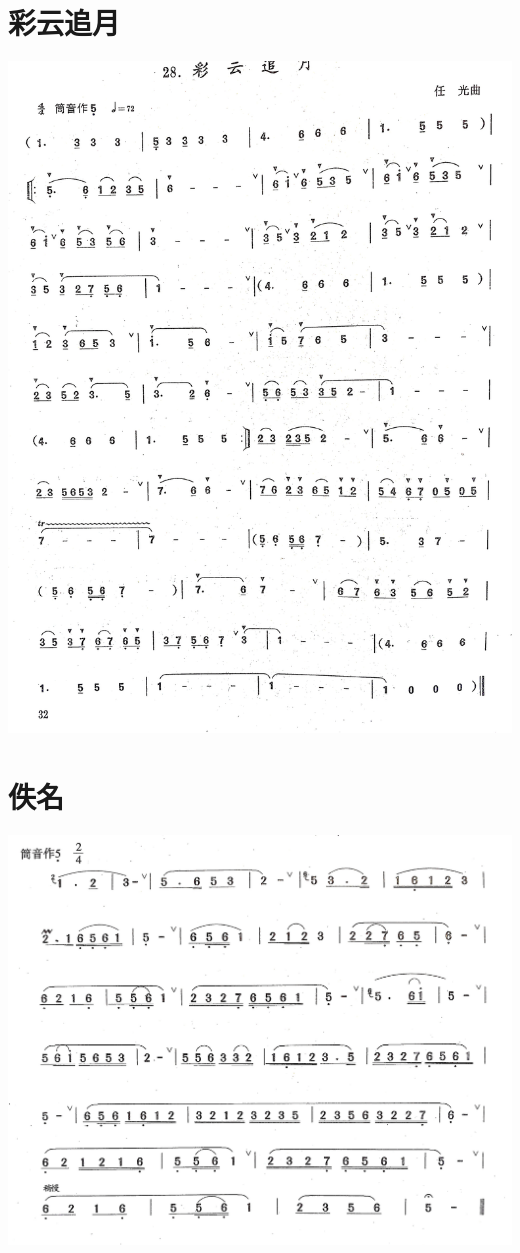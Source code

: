 \documentclass[cn,pad,chinese,chinesefont=nofont]{elegantbook}
\begin{document}
\section{彩云追月}         
	\includegraphics[width=\textwidth]{dongxiao/IMG_0941.jpg} 
\section{佚名}     
	\includegraphics[width=\textwidth]{dongxiao/IMG_0944.jpg}   
\end{document}
